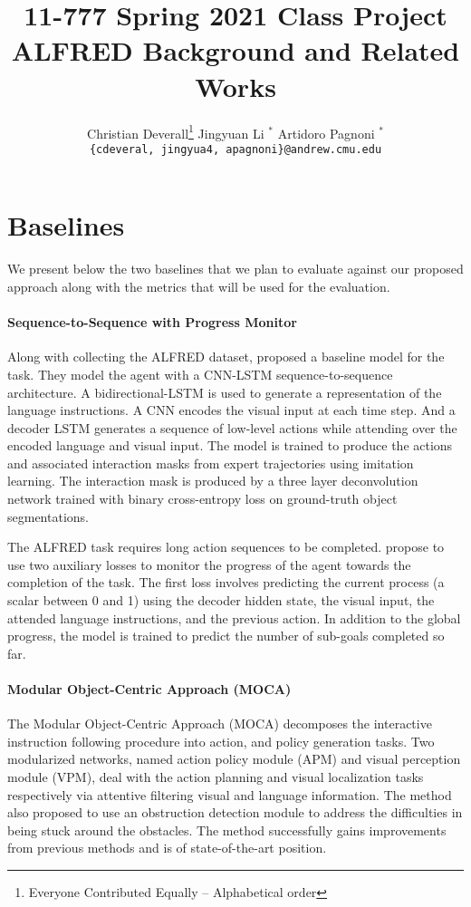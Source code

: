 \documentclass[11pt,a4paper]{article}
\title{11-777 Spring 2021 Class Project\\
ALFRED Background and Related Works}
\author{
  Christian Deverall\thanks{\hspace{4pt}Everyone Contributed Equally -- Alphabetical order} \hspace{2em} Jingyuan Li $^*$ \hspace{2em} Artidoro Pagnoni $^*$ \\
  \texttt{\{cdeveral, jingyua4, apagnoni\}@andrew.cmu.edu}
  }
\date{}
\begin{document}
\maketitle

\section{Baselines}
We present below the two baselines that we plan to evaluate against our proposed approach along with the metrics that will be used for the evaluation.

\paragraph{Sequence-to-Sequence with Progress Monitor}
Along with collecting the ALFRED dataset, \citet{ALFRED20} proposed a baseline model for the task. They model the agent with a CNN-LSTM sequence-to-sequence architecture. A bidirectional-LSTM is used to generate a representation of the language instructions. A CNN encodes the visual input at each time step. And a decoder LSTM generates a sequence of low-level actions while attending over the encoded language and visual input. The model is trained to produce the actions and associated interaction masks from expert trajectories using imitation learning. The interaction mask is produced by a three layer deconvolution network trained with binary cross-entropy loss on ground-truth object segmentations.

The ALFRED task requires long action sequences to be completed. \citet{ALFRED20} propose to use two auxiliary losses to monitor the progress of the agent towards the completion of the task. The first loss involves predicting the current process (a scalar between 0 and 1) using the decoder hidden state, the visual input, the attended language instructions, and the previous action. In addition to the global progress, the model is trained to predict the number of sub-goals completed so far. 

\paragraph{Modular Object-Centric Approach (MOCA)}The Modular Object-Centric Approach (MOCA) \citep{singh2020moca} decomposes the interactive instruction following procedure into action, and policy generation tasks. Two modularized networks, named action policy module (APM) and visual perception module (VPM), deal with the action planning and visual localization tasks respectively via attentive filtering visual and language information. The method also proposed to use an obstruction detection module to address the difficulties in being stuck around the obstacles. The method successfully gains improvements from previous methods and is of state-of-the-art position.
\end{document}
